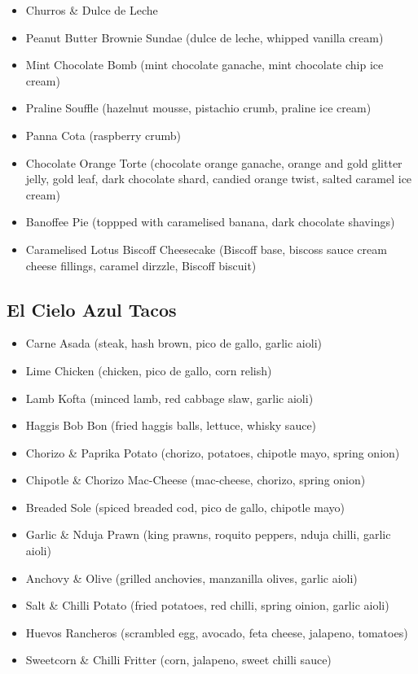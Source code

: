 \documentclass[11pt, english]{article}
\begin{document}
\begin{itemize}
		\item Churros \& Dulce de Leche
		\item Peanut Butter Brownie Sundae (dulce de leche, whipped vanilla cream)
		\item Mint Chocolate Bomb (mint chocolate ganache, mint chocolate chip ice cream)
		\item Praline Souffle (hazelnut mousse, pistachio crumb, praline ice cream)
		\item Panna Cota (raspberry crumb)
		\item Chocolate Orange Torte (chocolate orange ganache, orange and gold glitter jelly, gold leaf, dark chocolate shard, candied orange twist, salted caramel ice cream)
		\item Banoffee Pie (toppped with caramelised banana, dark chocolate shavings)
		\item Caramelised Lotus Biscoff Cheesecake (Biscoff base, biscoss sauce cream cheese fillings, caramel dirzzle, Biscoff biscuit)
        \end{itemize}

	\subsection{El Cielo Azul Tacos}

	\begin{itemize}
        \setlength\itemsep{0cm}
                \item Carne Asada (steak, hash brown, pico de gallo, garlic aioli)
		\item Lime Chicken (chicken, pico de gallo, corn relish)
		\item Lamb Kofta (minced lamb, red cabbage slaw, garlic aioli)
		\item Haggis Bob Bon (fried haggis balls, lettuce, whisky sauce)
		\item Chorizo \& Paprika Potato (chorizo, potatoes, chipotle mayo, spring onion)
		\item Chipotle \& Chorizo Mac-Cheese (mac-cheese, chorizo, spring onion)
		\item Breaded Sole (spiced breaded cod, pico de gallo, chipotle mayo)
		\item Garlic \& Nduja Prawn (king prawns, roquito peppers, nduja chilli, garlic aioli)
		\item Anchovy \& Olive (grilled anchovies, manzanilla olives, garlic aioli)
		\item Salt \& Chilli Potato (fried potatoes, red chilli, spring oinion, garlic aioli)
		\item Huevos Rancheros (scrambled egg, avocado, feta cheese, jalapeno, tomatoes)
		\item Sweetcorn \& Chilli Fritter (corn, jalapeno, sweet chilli sauce)
        \end{itemize}
\end{document}
